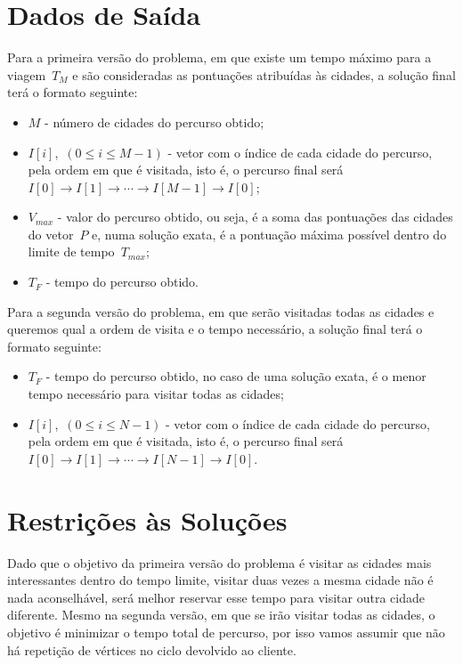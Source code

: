 \documentclass[12pt,a4paper,reqno]{report}
\numberwithin{equation}{section}
\begin{document}
\section{Dados de Saída}

Para a primeira versão do problema, em que existe um tempo máximo para a viagem~$T_M$ e são consideradas as pontuações atribuídas às cidades, a solução final terá o formato seguinte:
\begin{itemize}
	\item $M$ - número de cidades do percurso obtido;
	\item $I[i]$,~$(0 \leq i \leq M - 1)$ - vetor com o índice de cada cidade do percurso, pela ordem em que é visitada, isto é, o percurso final será~$I[0] \rightarrow I[1] \rightarrow \cdots \rightarrow I[M-1] \rightarrow I[0]$;
	\item $V_{max}$ - valor do percurso obtido, ou seja, é a soma das pontuações das cidades do vetor~$P$ e, numa solução exata, é a pontuação máxima possível dentro do limite de tempo~$T_{max}$;
	\item $T_F$ - tempo do percurso obtido.
\end{itemize}

Para a segunda versão do problema, em que serão visitadas todas as cidades e queremos qual a ordem de visita e o tempo necessário, a solução final terá o formato seguinte:
\begin{itemize}
	\item $T_F$ - tempo do percurso obtido, no caso de uma solução exata, é o menor tempo necessário para visitar todas as cidades;
	\item $I[i]$,~$(0 \leq i \leq N - 1)$ - vetor com o índice de cada cidade do percurso, pela ordem em que é visitada, isto é, o percurso final será~$I[0] \rightarrow I[1] \rightarrow \cdots \rightarrow I[N - 1] \rightarrow I[0]$.
\end{itemize}

\section{Restrições às Soluções}

Dado que o objetivo da primeira versão do problema é visitar as cidades mais interessantes dentro do tempo limite, visitar duas vezes a mesma cidade não é nada aconselhável, será melhor reservar esse tempo para visitar outra cidade diferente. Mesmo na segunda versão, em que se irão visitar todas as cidades, o objetivo é minimizar o tempo total de percurso, por isso vamos assumir que não há repetição de vértices no ciclo devolvido ao cliente.
\end{document}
